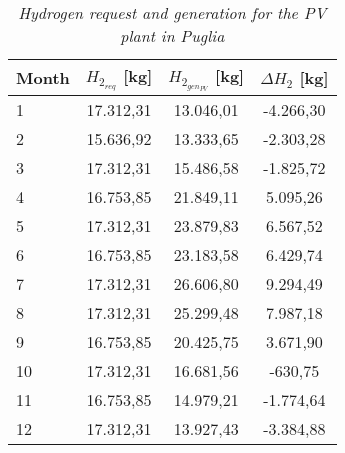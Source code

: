 \begin{table}[h]
\centering
\begin{tabular}{|l|c|c|c|}
\hline
\rowcolor{bluepoli!40} \textbf{Month} & \multicolumn{1}{l|}{\textbf{$H_{2_{req}}$   [kg]}} & \multicolumn{1}{l|}{\textbf{$H_{2_{gen_{PV}}}$ [kg]}} & \multicolumn{1}{l|}{\textbf{$\Delta H_2$ [kg]}} \\ \hline
1  & 17.312,31     & 13.046,01     & -4.266,30 \\ \hline
2  & 15.636,92     & 13.333,65     & -2.303,28 \\ \hline
3  & 17.312,31     & 15.486,58     & -1.825,72 \\ \hline
4  & 16.753,85     & 21.849,11     & 5.095,26  \\ \hline
5  & 17.312,31     & 23.879,83     & 6.567,52  \\ \hline
6  & 16.753,85     & 23.183,58     & 6.429,74  \\ \hline
7  & 17.312,31     & 26.606,80     & 9.294,49  \\ \hline
8  & 17.312,31     & 25.299,48     & 7.987,18  \\ \hline
9  & 16.753,85     & 20.425,75     & 3.671,90  \\ \hline
10 & 17.312,31     & 16.681,56     & -630,75   \\ \hline
11 & 16.753,85     & 14.979,21     & -1.774,64 \\ \hline
12 & 17.312,31     & 13.927,43     & -3.384,88 \\ \hline
\end{tabular}
\caption{\textit{Hydrogen request and generation for the PV plant in Puglia}}
\label{tab:hydrogenpuglia}
\end{table}